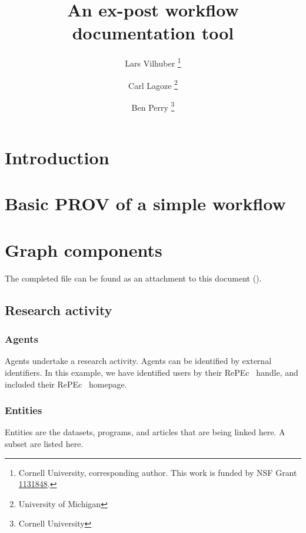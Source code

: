 \documentclass[x11names]{article}
\title{An ex-post workflow documentation tool}
\author{Lars Vilhuber%
\footnote{Cornell University, corresponding author. This work is funded by NSF Grant \href{http://www.nsf.gov/awardsearch/showAward.do?AwardNumber=1131848}{1131848}.}
\and Carl Lagoze%
\footnote{University of Michigan}
\and Ben Perry%
\footnote{Cornell University}
}
\newcommand{\repec}{RePEc}
\begin{document}
\maketitle
\providecommand{\cmark}[2][]{\relax} 
%
\section{Introduction}
\label{sec:intro}



\section{Basic PROV of a simple workflow}
\section{Graph components}
The completed file can be found as an attachment to this document 
().
\lstset{language=XML,breaklines=true}
\subsection{Research activity}
\subsubsection*{Agents}
Agents undertake a research activity. Agents can be identified by external identifiers. In this 
example, we have identified users by their \repec~ handle, and included their \repec~ 
homepage. 



\subsubsection*{Entities}
Entities are the datasets, programs, and articles that are being linked here.  A subset are listed 
here.


\end{document}
